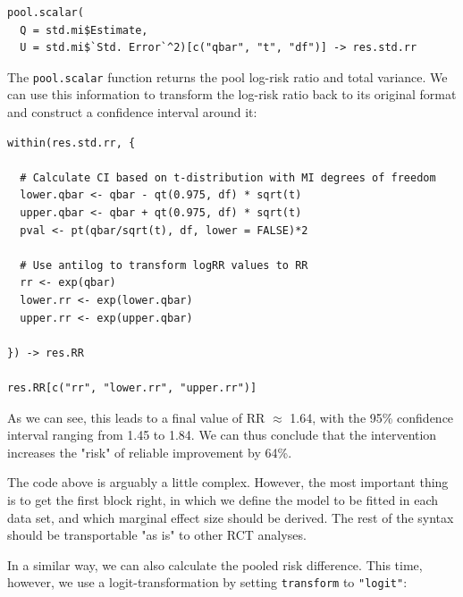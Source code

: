 \begin{lstlisting}
pool.scalar(
  Q = std.mi$Estimate,
  U = std.mi$`Std. Error`^2)[c("qbar", "t", "df")] -> res.std.rr
\end{lstlisting}

The \texttt{pool.scalar} function returns the pool log-risk ratio and total variance. We can use this information to transform the log-risk ratio back to its original format and construct a confidence interval around it:

\begin{lstlisting}
within(res.std.rr, {
  
  # Calculate CI based on t-distribution with MI degrees of freedom
  lower.qbar <- qbar - qt(0.975, df) * sqrt(t)
  upper.qbar <- qbar + qt(0.975, df) * sqrt(t)
  pval <- pt(qbar/sqrt(t), df, lower = FALSE)*2
  
  # Use antilog to transform logRR values to RR
  rr <- exp(qbar)
  lower.rr <- exp(lower.qbar)
  upper.rr <- exp(upper.qbar)
  
}) -> res.RR

res.RR[c("rr", "lower.rr", "upper.rr")]
\end{lstlisting}


As we can see, this leads to a final value of RR $\approx$ 1.64, with the 95\% confidence interval ranging from 1.45 to 1.84. We can thus conclude that the intervention increases the "risk" of reliable improvement by 64\%. 

The code above is arguably a little complex. However, the most important thing is to get the first block right, in which we define the model to be fitted in each data set, and which marginal effect size should be derived. The rest of the syntax should be transportable "as is" to other RCT analyses.

In a similar way, we can also calculate the pooled risk difference. This time, however, we use a logit-transformation by setting \texttt{transform} to \texttt{"logit"}:

